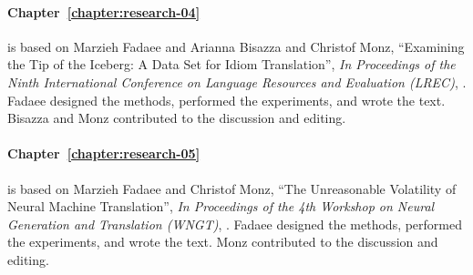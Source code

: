 \paragraph{Chapter~\ref{chapter:research-04}} is based on Marzieh Fadaee and Arianna Bisazza and Christof Monz,
``Examining the Tip of the Iceberg: A Data Set for Idiom Translation'',
\textit{In Proceedings of the Ninth International Conference on Language Resources and Evaluation (LREC)},
\citep{L18-1148}.
Fadaee designed the methods, performed the experiments, and wrote the text.
Bisazza and Monz contributed to the discussion and editing.

\paragraph{Chapter~\ref{chapter:research-05}} is based on Marzieh Fadaee and Christof Monz,
``The Unreasonable Volatility of Neural Machine Translation'', 
\textit{In Proceedings of the 4th Workshop on Neural Generation and Translation (WNGT)},
\citep{fadaee_new}.
Fadaee designed the methods, performed the experiments, and wrote the text.
Monz contributed to the discussion and editing.



